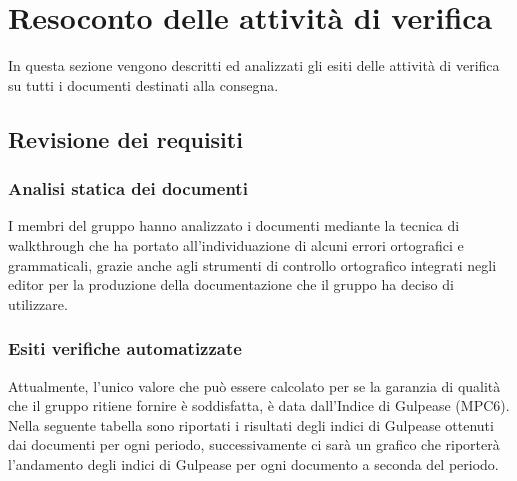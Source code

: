\section{Resoconto delle attività di verifica}
In questa sezione vengono descritti ed analizzati gli esiti delle attività di verifica su tutti i documenti destinati alla consegna.

\subsection{Revisione dei requisiti}

\subsubsection{Analisi statica dei documenti}
I membri del gruppo \Gruppo{} hanno analizzato i documenti mediante la tecnica di walkthrough che ha portato all'individuazione di 
alcuni errori ortografici e grammaticali, grazie anche agli strumenti di controllo ortografico integrati negli editor per la produzione
della documentazione che il gruppo ha deciso di utilizzare.

\subsubsection{Esiti verifiche automatizzate}
Attualmente, l'unico valore che può essere calcolato per  se la garanzia di qualità che il gruppo ritiene fornire è
soddisfatta, è data dall'Indice di Gulpease (MPC6).
Nella seguente tabella sono riportati i risultati degli indici di Gulpease ottenuti dai documenti per ogni periodo, successivamente ci sarà un grafico che riporterà l'andamento degli indici di Gulpease per ogni documento a seconda del periodo.

